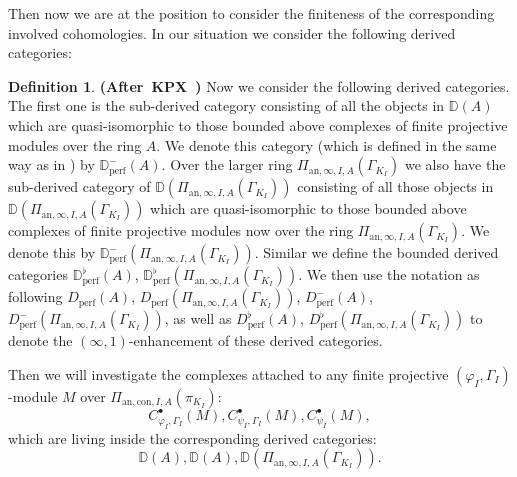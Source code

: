 \documentclass[12pt]{amsart}
\theoremstyle{definition}
\newtheorem{definition}[theorem]{Definition}
\numberwithin{equation}{section}
\begin{document}
\indent Then now we are at the position to consider the finiteness of the corresponding involved cohomologies. In our situation we consider the following derived categories:

\begin{definition} \mbox{\bf{(After KPX \cite[Notation 4.1.2]{KPX})}} \label{definition4.5}
Now we consider the following derived categories. The first one is the sub-derived category consisting of all the objects in $\mathbb{D}(A)$ which are quasi-isomorphic to those bounded above complexes of finite projective modules over the ring $A$. We denote this category (which is defined in the same way as in \cite[Notation 4.1.2]{KPX}) by $\mathbb{D}^-_\mathrm{perf}(A)$. Over the larger ring $\Pi_{\mathrm{an},\infty,I,A}(\Gamma_{K_I})$ we also have the sub-derived category of $\mathbb{D}(\Pi_{\mathrm{an},\infty,I,A}(\Gamma_{K_I}))$ consisting of all those objects in $\mathbb{D}(\Pi_{\mathrm{an},\infty,I,A}(\Gamma_{K_I}))$ which are quasi-isomorphic to those bounded above complexes of finite projective modules now over the ring $\Pi_{\mathrm{an},\infty,I,A}(\Gamma_{K_I})$. We denote this by $\mathbb{D}^-_\mathrm{perf}(\Pi_{\mathrm{an},\infty,I,A}(\Gamma_{K_I}))$. Similar we define the bounded derived categories $\mathbb{D}^\flat_\mathrm{perf}(A)$, $\mathbb{D}^\flat_\mathrm{perf}(\Pi_{\mathrm{an},\infty,I,A}(\Gamma_{K_I}))$. We then use the notation as following $D_\mathrm{perf}(A)$, $D_\mathrm{perf}(\Pi_{\mathrm{an},\infty,I,A}(\Gamma_{K_I}))$, $D^-_\mathrm{perf}(A)$, $D^-_\mathrm{perf}(\Pi_{\mathrm{an},\infty,I,A}(\Gamma_{K_I}))$, as well as $D^\flat_\mathrm{perf}(A)$, $D^\flat_\mathrm{perf}(\Pi_{\mathrm{an},\infty,I,A}(\Gamma_{K_I}))$ to denote the $(\infty, 1)$-enhancement of these derived categories.
\end{definition}


\indent Then we will investigate the complexes attached to any finite projective $(\varphi_I,\Gamma_I)$-module $M$ over $\Pi_{\mathrm{an},\mathrm{con},I,A}(\pi_{K_I})$:
\begin{displaymath}
C^\bullet_{\varphi_I,\Gamma_I}(M), C^\bullet_{\psi_I,\Gamma_I}(M),C^\bullet_{\psi_I}(M),	
\end{displaymath}
which are living inside the corresponding derived categories:
\begin{displaymath}
\mathbb{D}(A),\mathbb{D}(A),\mathbb{D}(\Pi_{\mathrm{an},\infty,I,A}(\Gamma_{K_I})).	
\end{displaymath}
\end{document}

